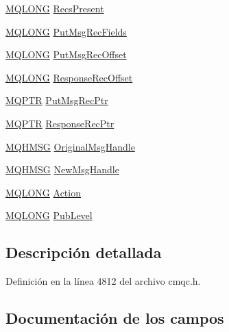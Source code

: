 \begin{DoxyCompactItemize}
\item 
\hyperlink{cmqc_8h_a1fb8d28cbda3fa8766a9821230cdb6d5}{M\+Q\+L\+O\+N\+G} \hyperlink{structtag_m_q_p_m_o_a7592da03e0f1c9bc79c9dd4e641dcf73}{Recs\+Present}
\item 
\hyperlink{cmqc_8h_a1fb8d28cbda3fa8766a9821230cdb6d5}{M\+Q\+L\+O\+N\+G} \hyperlink{structtag_m_q_p_m_o_aea1b77e1a6f2b6f18526055315f8b175}{Put\+Msg\+Rec\+Fields}
\item 
\hyperlink{cmqc_8h_a1fb8d28cbda3fa8766a9821230cdb6d5}{M\+Q\+L\+O\+N\+G} \hyperlink{structtag_m_q_p_m_o_a49f55d9686cdc9c051e09950fede2098}{Put\+Msg\+Rec\+Offset}
\item 
\hyperlink{cmqc_8h_a1fb8d28cbda3fa8766a9821230cdb6d5}{M\+Q\+L\+O\+N\+G} \hyperlink{structtag_m_q_p_m_o_a944cab1325e5696fccf9202988c81066}{Response\+Rec\+Offset}
\item 
\hyperlink{cmqc_8h_a0b835d8e479d7c42242ed9c6b6572f5a}{M\+Q\+P\+T\+R} \hyperlink{structtag_m_q_p_m_o_a6721429432b0d4229bdc5477777f0937}{Put\+Msg\+Rec\+Ptr}
\item 
\hyperlink{cmqc_8h_a0b835d8e479d7c42242ed9c6b6572f5a}{M\+Q\+P\+T\+R} \hyperlink{structtag_m_q_p_m_o_a3f96e15a2299a7c139b78c4e1b8cb7cb}{Response\+Rec\+Ptr}
\item 
\hyperlink{cmqc_8h_a3d110c5d019358ed30e069abddd9525c}{M\+Q\+H\+M\+S\+G} \hyperlink{structtag_m_q_p_m_o_ae085f237b8d312cc17a08ee5b890698b}{Original\+Msg\+Handle}
\item 
\hyperlink{cmqc_8h_a3d110c5d019358ed30e069abddd9525c}{M\+Q\+H\+M\+S\+G} \hyperlink{structtag_m_q_p_m_o_a9daf07c64f152de0db1a09b8033a87d5}{New\+Msg\+Handle}
\item 
\hyperlink{cmqc_8h_a1fb8d28cbda3fa8766a9821230cdb6d5}{M\+Q\+L\+O\+N\+G} \hyperlink{structtag_m_q_p_m_o_ac3faa33ea60209cfd14ccd29ef325788}{Action}
\item 
\hyperlink{cmqc_8h_a1fb8d28cbda3fa8766a9821230cdb6d5}{M\+Q\+L\+O\+N\+G} \hyperlink{structtag_m_q_p_m_o_ab5df476923b8b98b937d42b572a20e07}{Pub\+Level}
\end{DoxyCompactItemize}


\subsection{Descripción detallada}


Definición en la línea 4812 del archivo cmqc.\+h.



\subsection{Documentación de los campos}
\hypertarget{structtag_m_q_p_m_o_ac3faa33ea60209cfd14ccd29ef325788}{}
